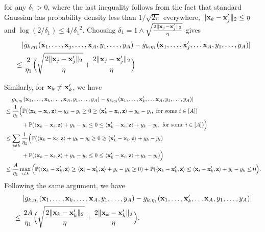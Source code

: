 for any ${\delta_1}>0$, 
where the last inequality follows from the fact that standard Gaussian has probability density less than $1/\sqrt{2\pi}$ everywhere,  $\|{\mathbf x}_k-{\mathbf x}_j'\|_2\leq {\eta}$ and $\log(2/{\delta_1})\leq 4/{\delta_1}^2$. Choosing ${\delta_1}=1\wedge\sqrt{\frac{2\|{\mathbf x}_j-{\mathbf x}_j'\|_2}{{\eta}}}$ gives 
\begin{align*}
 &\quad |g_{k,{\eta_1}}({\mathbf x}_1,\ldots,{\mathbf x}_j,\ldots,{\mathbf x}_A,y_1,\ldots,y_A)-g_{k,{\eta_1}}({\mathbf x}_1,\ldots,{\mathbf x}'_j,\ldots{\mathbf x}_A,y_1,\ldots,y_A)|\\
 &\leq  
  \frac{2}{{\eta_1}}\Big(\sqrt{\frac{2\|{\mathbf x}_j-{\mathbf x}_j'\|_2}{{\eta}}}+\frac{2\|{\mathbf x}_j-{\mathbf x}_j'\|_2}{{\eta}}\Big)
\end{align*}

Similarly, for ${\mathbf x}_k\neq{\mathbf x}_k'$, we have 
\begin{align*}
     &\quad|g_{k,{\eta_1}}({\mathbf x}_1,\ldots,{\mathbf x}_k,\ldots,{\mathbf x}_A,y_1,\ldots,y_A)-g_{k,{\eta_1}}({\mathbf x}_1,\ldots,{\mathbf x}'_k,\ldots{\mathbf x}_A,y_1,\ldots,y_A)|
        \\
     &\leq
     \frac{1}{{\eta_1}}\Big(\mathbb{P}(\left\langle{\mathbf x}_k-{\mathbf x}_i,{\mathbf z}\right\rangle+y_k-y_i\geq0\geq \left\langle{\mathbf x}'_k-{\mathbf x}_i,{\mathbf z}\right\rangle+y_k-y_i,\text{~for some~}i\in[A])\\&\qquad~~~+\mathbb{P}(\left\langle{\mathbf x}_k-{\mathbf x}_i,{\mathbf z}\right\rangle+y_k-y_i\leq0\leq \left\langle{\mathbf x}_k'-{\mathbf x}_i,{\mathbf z}\right\rangle+y_k-y_i,\text{~for some~}i\in[A])\Big)
     \\
       &\leq
    \sum_{i\neq k} \frac{1}{{\eta_1}}\Big(\mathbb{P}(\left\langle{\mathbf x}_k-{\mathbf x}_i,{\mathbf z}\right\rangle+y_k-y_i\geq0\geq \left\langle{\mathbf x}_k'-{\mathbf x}_i,{\mathbf z}\right\rangle+y_k-y_i)\\&\qquad~~~+\mathbb{P}(\left\langle{\mathbf x}_k-{\mathbf x}_i,{\mathbf z}\right\rangle+y_k-y_i\leq0\leq \left\langle{\mathbf x}_k'-{\mathbf x}_i,{\mathbf z}\right\rangle+y_k-y_i)\Big)\\
    &\leq \frac{A}{{\eta_1}}\max_{i
    \neq k}\Big(\mathbb{P}(\left\langle{\mathbf x}_k-{\mathbf x}_k',{\mathbf z}\right\rangle\geq\left\langle{\mathbf x}_i-{\mathbf x}_k',{\mathbf z}\right\rangle+y_i-y_k\geq0 )+\mathbb{P}(\left\langle{\mathbf x}_k-{\mathbf x}_k',{\mathbf z}\right\rangle\leq \left\langle{\mathbf x}_i-{\mathbf x}_k',{\mathbf z}\right\rangle+y_i-y_k\leq0\Big).
\end{align*}
Following the same argument, we have 
\begin{align*}
&\quad~|g_{k,{\eta_1}}({\mathbf x}_1,\ldots,{\mathbf x}_k,\ldots,{\mathbf x}_A,y_1,\ldots,y_A)-g_{k,{\eta_1}}({\mathbf x}_1,\ldots,{\mathbf x}'_k,\ldots{\mathbf x}_A,y_1,\ldots,y_A)|\\&\leq   \frac{2A}{{\eta_1}}\Big(\sqrt{\frac{2\|{\mathbf x}_k-{\mathbf x}_k'\|_2}{{\eta}}}+\frac{2\|{\mathbf x}_k-{\mathbf x}_k'\|_2}{{\eta}}\Big).
\end{align*}

